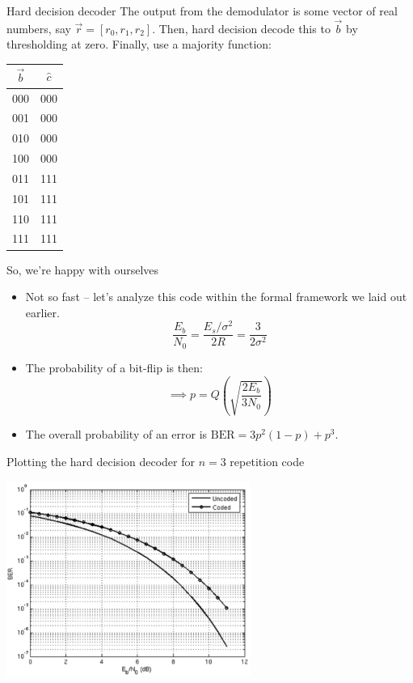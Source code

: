 \documentclass[aspectratio=1610, 10pt]{beamer}
\begin{document}
\begin{frame}[label={sec:org8ba14ad}]{Hard decision decoder}
The output from the demodulator is some vector of real numbers,
say \(\vec{r} = [r_0, r_1, r_2]\). Then, hard decision decode this to
\(\vec{b}\) by thresholding at zero. Finally, use a majority function:

\begin{center}
\begin{tabular}{cc}
\toprule
\(\vec{b}\) & \(\hat{c}\)\\
\midrule
000 & 000\\
001 & 000\\
010 & 000\\
100 & 000\\
\midrule
011 & 111\\
101 & 111\\
110 & 111\\
111 & 111\\
\bottomrule
\end{tabular}

\end{center}
\end{frame}

\begin{frame}[label={sec:org119ada6}]{So, we're happy with ourselves}
\begin{itemize}
\item Not so fast -- let's analyze this code within the formal framework
we laid out earlier.
$$\frac{E_b}{N_0} = \frac{E_s/\sigma^2}{2R} = \frac{3}{2\sigma^2}$$
\item The probability of a bit-flip is then:
$$\implies p = Q\left(\sqrt{\frac{2E_b}{3N_0}} \right)$$
\item The overall probability of an error is \(\text{BER} = 3p^2(1-p) +
  p^3\).
\end{itemize}
\end{frame}

\begin{frame}[label={sec:org0c26db0}]{Plotting the hard decision decoder for \(n=3\) repetition code}
\begin{center}
\includegraphics[width=0.6\textwidth]{./repetition_ber_snr.png}
\end{center}
\end{frame}
\end{document}
